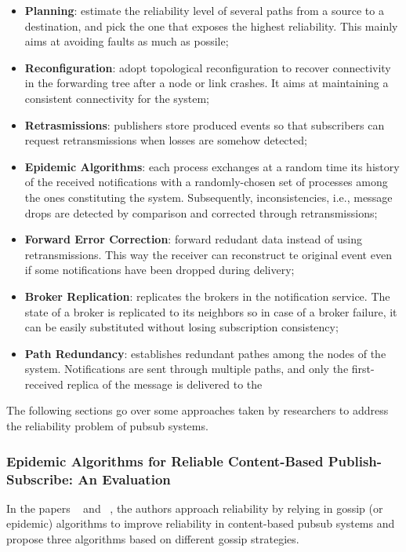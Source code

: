 \begin{itemize}
  \item \textbf{Planning}: estimate the reliability level of several paths from a source to a destination, and pick the one that exposes the highest reliability. This mainly aims at avoiding faults as much as possile;
  \item \textbf{Reconfiguration}: adopt topological reconfiguration to recover connectivity in the forwarding tree after a node or link crashes. It aims at maintaining a consistent connectivity for the system;
  \item \textbf{Retrasmissions}: publishers store produced events so that subscribers can request retransmissions when losses are somehow detected;
  \item \textbf{Epidemic Algorithms}: each process exchanges at a random time its history of the received notifications with a randomly-chosen set of processes among the ones constituting the system. Subsequently, inconsistencies, i.e., message drops are detected by comparison and corrected through retransmissions;
  \item \textbf{Forward Error Correction}: forward redudant data instead of using retransmissions. This way the receiver can reconstruct te original event even if some notifications have been dropped during delivery;
  \item \textbf{Broker Replication}: replicates the brokers in the notification service. The state of a broker is replicated to its neighbors so in case of a broker failure, it can be easily substituted without losing subscription consistency;
  \item \textbf{Path Redundancy}: establishes redundant pathes among the nodes of the system. Notifications are sent through multiple paths, and only the first-received replica of the message is delivered to the   
\end{itemize}

The following sections go over some approaches taken by researchers to address the reliability problem of \gls{pubsub} systems.

\subsubsection{Epidemic Algorithms for Reliable Content-Based Publish-Subscribe: An Evaluation}
\label{sec:reliable_gossip}

In the papers ~\cite{epidemic-algs-for-pubsub} and ~\cite{intro-epidemic-algs-for-pubsub}, the authors approach reliability by relying in gossip (or epidemic) algorithms to improve reliability in content-based \gls{pubsub} systems and propose three algorithms based on different gossip strategies.

